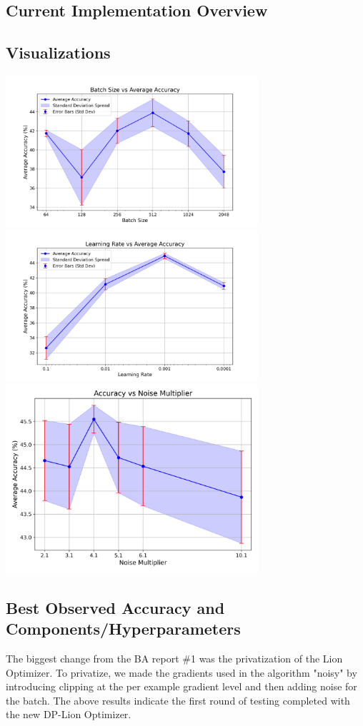\subsection{Current Implementation Overview}\label{subsec:current-implementation2}


\subsection{Visualizations}\label{subsec:best-accuracy-viz2}
\includegraphics[width=0.7\textwidth]{batch_size_vs_accuracy.png}
\includegraphics[width=0.7\textwidth]{learning_rate_vs_accuracy.png}
\includegraphics[width=0.7\textwidth]{Accuracy vs Noise Multiplier.png}

\subsection{Best Observed Accuracy and Components/Hyperparameters}\label{subsec:best-accuracy2}
The biggest change from the BA report \#1 was the privatization of the Lion Optimizer. To privatize, we made the gradients used in the algorithm "noisy" by introducing clipping
at the per example gradient level and then adding noise for the batch. The above results indicate the first round of testing completed with the new DP-Lion Optimizer.

